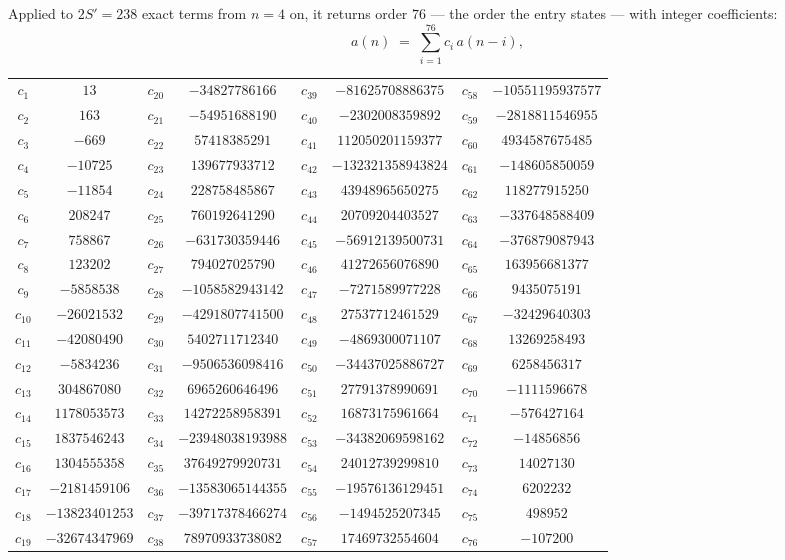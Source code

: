 \documentclass[11pt,a4paper]{article}
\theoremstyle{plain}
\theoremstyle{definition}
\begin{document}
Applied to $2S'=238$ exact terms from $n=4$ on, it returns order $76$ --- the
order the entry states --- with integer coefficients:
\[
a(n)\;=\;\sum_{i=1}^{76}c_i\,a(n-i),
\]
\begin{center}\small
\begin{tabular}{cccccccc}
$c_{1}$ & $13$ & $c_{20}$ & $-34827786166$ & $c_{39}$ & $-81625708886375$ & $c_{58}$ & $-10551195937577$ \\
$c_{2}$ & $163$ & $c_{21}$ & $-54951688190$ & $c_{40}$ & $-2302008359892$ & $c_{59}$ & $-2818811546955$ \\
$c_{3}$ & $-669$ & $c_{22}$ & $57418385291$ & $c_{41}$ & $112050201159377$ & $c_{60}$ & $4934587675485$ \\
$c_{4}$ & $-10725$ & $c_{23}$ & $139677933712$ & $c_{42}$ & $-132321358943824$ & $c_{61}$ & $-148605850059$ \\
$c_{5}$ & $-11854$ & $c_{24}$ & $228758485867$ & $c_{43}$ & $43948965650275$ & $c_{62}$ & $118277915250$ \\
$c_{6}$ & $208247$ & $c_{25}$ & $760192641290$ & $c_{44}$ & $20709204403527$ & $c_{63}$ & $-337648588409$ \\
$c_{7}$ & $758867$ & $c_{26}$ & $-631730359446$ & $c_{45}$ & $-56912139500731$ & $c_{64}$ & $-376879087943$ \\
$c_{8}$ & $123202$ & $c_{27}$ & $794027025790$ & $c_{46}$ & $41272656076890$ & $c_{65}$ & $163956681377$ \\
$c_{9}$ & $-5858538$ & $c_{28}$ & $-1058582943142$ & $c_{47}$ & $-7271589977228$ & $c_{66}$ & $9435075191$ \\
$c_{10}$ & $-26021532$ & $c_{29}$ & $-4291807741500$ & $c_{48}$ & $27537712461529$ & $c_{67}$ & $-32429640303$ \\
$c_{11}$ & $-42080490$ & $c_{30}$ & $5402711712340$ & $c_{49}$ & $-4869300071107$ & $c_{68}$ & $13269258493$ \\
$c_{12}$ & $-5834236$ & $c_{31}$ & $-9506536098416$ & $c_{50}$ & $-34437025886727$ & $c_{69}$ & $6258456317$ \\
$c_{13}$ & $304867080$ & $c_{32}$ & $6965260646496$ & $c_{51}$ & $27791378990691$ & $c_{70}$ & $-1111596678$ \\
$c_{14}$ & $1178053573$ & $c_{33}$ & $14272258958391$ & $c_{52}$ & $16873175961664$ & $c_{71}$ & $-576427164$ \\
$c_{15}$ & $1837546243$ & $c_{34}$ & $-23948038193988$ & $c_{53}$ & $-34382069598162$ & $c_{72}$ & $-14856856$ \\
$c_{16}$ & $1304555358$ & $c_{35}$ & $37649279920731$ & $c_{54}$ & $24012739299810$ & $c_{73}$ & $14027130$ \\
$c_{17}$ & $-2181459106$ & $c_{36}$ & $-13583065144355$ & $c_{55}$ & $-19576136129451$ & $c_{74}$ & $6202232$ \\
$c_{18}$ & $-13823401253$ & $c_{37}$ & $-39717378466274$ & $c_{56}$ & $-1494525207345$ & $c_{75}$ & $498952$ \\
$c_{19}$ & $-32674347969$ & $c_{38}$ & $78970933738082$ & $c_{57}$ & $17469732554604$ & $c_{76}$ & $-107200$ \\
\end{tabular}
\end{center}
\end{document}
